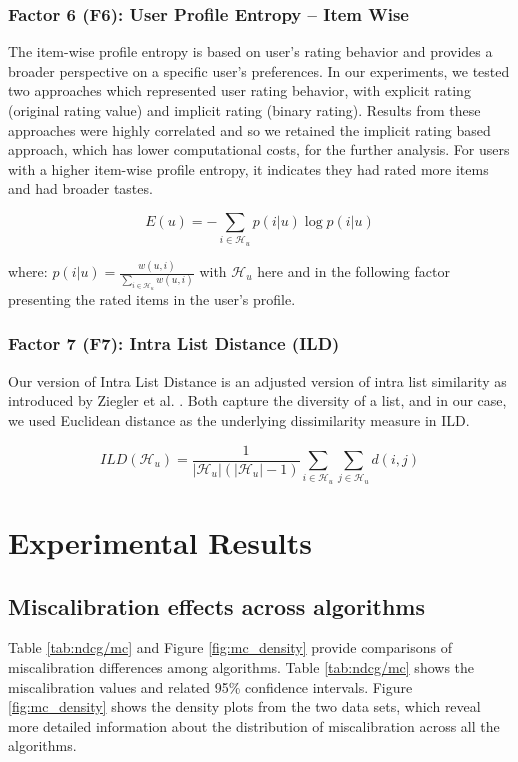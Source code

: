 \subsubsection{Factor 6 (F6): User Profile Entropy -- Item Wise}
The item-wise profile entropy is based on user's rating behavior and provides a broader perspective on a specific user's preferences. In our experiments, we tested two approaches which represented user rating behavior, with explicit rating (original rating value) and implicit rating (binary rating). Results from these approaches were highly correlated and so we retained the implicit rating based approach, which has lower computational costs, for the further analysis. For users with a higher item-wise profile entropy, it indicates they had rated more items and had broader tastes.

\begin{equation} \label{upe_i}
E(u) = -\sum_{i \in  \mathcal{H}_u}{p(i|u)\log{p(i|u)}}
\end{equation}

where: $p(i|u) = \frac{w(u,i)}{\sum_{i \in \mathcal{H}_u}{w(u,i)}}$ with $\mathcal{H}_u$ here and in the following factor presenting the rated items in the user's profile. 

\subsubsection{Factor 7 (F7): Intra List Distance (ILD)}
Our version of Intra List Distance \cite{eskandanian2016user} is an adjusted version of intra list similarity as introduced by Ziegler et al. \cite{ziegler2005improving}. Both capture the diversity of a list, and in our case, we used Euclidean distance as the underlying dissimilarity measure in ILD.

\begin{equation}
    ILD(\mathcal{H}_u) = \frac{1}{|\mathcal{H}_u|(|\mathcal{H}_u|-1)}\sum_{i \in \mathcal{H}_u}\sum_{j \in \mathcal{H}_u}d(i,j)
\end{equation}


\section{Experimental Results}

\subsection{Miscalibration effects across algorithms}
Table \ref{tab:ndcg/mc} and Figure \ref{fig:mc_density} provide comparisons of miscalibration differences among algorithms. Table \ref{tab:ndcg/mc} shows the miscalibration values and related 95\% confidence intervals. Figure \ref{fig:mc_density} shows the density plots from the two data sets, which reveal more detailed information about the distribution of miscalibration across all the algorithms.

